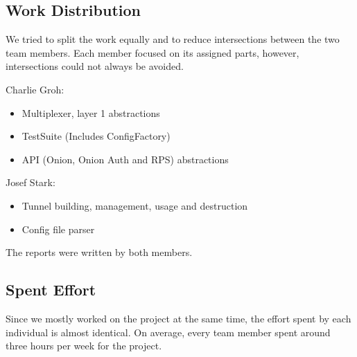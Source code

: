 \documentclass{article}
\begin{document}
\subsection{Work Distribution}
We tried to split the work equally and to reduce intersections between the two team members. Each member focused on its assigned parts, however, intersections could not always be avoided.

Charlie Groh:
\begin{itemize}
	\item Multiplexer, layer 1 abstractions
	\item TestSuite (Includes ConfigFactory)
	\item API (Onion, Onion Auth and RPS) abstractions
\end{itemize}

Josef Stark:
\begin{itemize}
	\item Tunnel building, management, usage and destruction
	\item Config file parser
\end{itemize}
The reports were written by both members.


\subsection{Spent Effort}
Since we mostly worked on the project at the same time, the effort spent by each individual is
almost identical. On average, every team member spent around three hours per week for the project.
\end{document}
